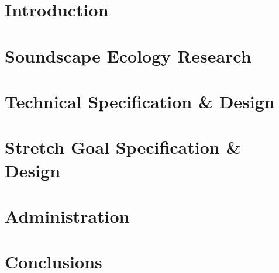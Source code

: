 \documentclass[12pt, twoside]{article}
\begin{document}
  
  \pagestyle{empty}                                     %
  \tableofcontents
  \newpage


  \pagestyle{plain} %
  \setcounter{page}{1}

  \section{Introduction}
  
  
  
  
  \newpage

  \section{Soundscape Ecology Research}
  
  
  
  \newpage

  \section{Technical Specification \& Design}
  
  
  
  
  
  
  
  
  
  
  
  
  
  
  
  
  \newpage

  \section{Stretch Goal Specification \& Design}
  
  
  \newpage

  \section{Administration}
  
  
  
  \newpage

  \section{Conclusions}
  
  
  
  \newpage

  \thispagestyle{empty}
  \printbibliography
\end{document}
